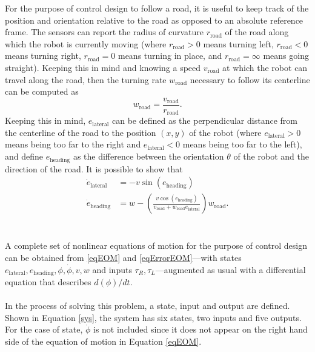 \documentclass[12pt]{article}
\begin{document}
For the purpose of control design to follow a road, it is useful to keep track of the position and orientation relative to the road as opposed to an absolute reference frame. The sensors can report the radius of curvature $r_\text{road}$ of the road along which the robot is currently moving (where $r_\text{road}>0$ means turning left, $r_\text{road}<0$ means turning right, $r_\text{road}=0$ means turning in place, and $r_\text{road}=\infty$ means going straight). Keeping this in mind and knowing  a speed $v_\text{road}$ at which the robot can travel along the road, then the turning rate $w_\text{road}$ necessary to follow its centerline can be computed as
\begin{equation}
\label{eqCurvature}
w_\text{road} = \frac{v_\text{road}}{r_\text{road}}.
\end{equation}
Keeping this in mind, $e_\text{lateral}$ can be defined as the perpendicular distance from the centerline of the road to the position $(x,y)$ of the robot (where $e_\text{lateral}>0$ means being too far to the right and $e_\text{lateral}<0$ means being too far to the left), and define $e_\text{heading}$ as the difference between the orientation $\theta$ of the robot and the direction of the road. It is possible to show that
\begin{equation}
\label{eqErrorEOM}
\begin{aligned}
\dot{e}_\text{lateral} &= -v\sin\left(e_\text{heading}\right) \\
\dot{e}_\text{heading} &= w-\left(\frac{v\cos\left(e_\text{heading}\right)}{v_\text{road}+w_\text{road}e_\text{lateral}}\right)w_\text{road}.
\end{aligned}
\end{equation}
\\ \\
A complete set of nonlinear equations of motion for the purpose of control design can be obtained from \eqref{eqEOM} and \eqref{eqErrorEOM}---with states $e_\text{lateral}, e_\text{heading}, \phi, \dot{\phi}, v, w$ and inputs $\tau_{R},\tau_{L}$---augmented as usual with a differential equation that describes $d(\phi)/dt$.
\\ \\
In the process of solving this problem, a state, input and output are defined. Shown in Equation \eqref{sys}, the system has six states, two inputs and five outputs. For the case of state, $ \dot{\phi}$ is not included since it does not appear on the right hand side of the equation of motion in Equation \eqref{eqEOM}.
\end{document}
